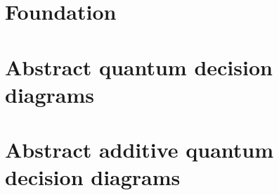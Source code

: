 \section{Foundation}



\section{Abstract quantum decision diagrams}



\section{Abstract additive quantum decision diagrams}

